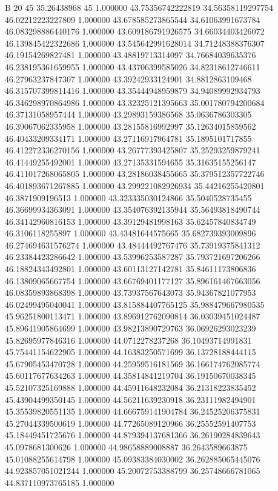 


B		20
45	35.26438968	45	1.000000
43.75356742222819	34.56358119297754	46.02212223227809	1.000000
43.678585273865544	34.61063991673784	46.083298886440176	1.000000
43.609186791926575	34.66034403426072	46.139845422322686	1.000000
43.545642991628014	34.71248388376307	46.19154269827481	1.000000
43.48819713314097	34.76684039635376	46.238195361659955	1.000000
43.43706399585026	34.82318612746611	46.27963237847307	1.000000
43.39242933124901	34.8812863109468	46.315707399811416	1.000000
43.35444948959879	34.94089992934793	46.346298970864986	1.000000
43.32325121395663	35.001780794200684	46.37131058957444	1.000000
43.29893159386568	35.0636786303305	46.39067062335958	1.000000
43.28155816992997	35.12634015859562	46.40433209334171	1.000000
43.27116917964781	35.1895101717855	46.412272336270156	1.000000
43.26777393425807	35.25293259879241	46.41449255492001	1.000000
43.27135331594655	35.31635155256147	46.411017268065805	1.000000
43.28186038455665	35.379512357722746	46.401893671267885	1.000000
43.299221082926934	35.44216255420801	46.3871909196513	1.000000
43.323335030124866	35.5040528735455	46.36699934363091	1.000000
43.354076392135944	35.56493818490744	46.34142960816153	1.000000
43.39129481998163	35.62457840834749	46.3106118255897	1.000000
43.43481644575665	35.682739393009896	46.274694631576274	1.000000
43.48444492767476	35.73919375841312	46.23384423286642	1.000000
43.53996253587287	35.793721697206266	46.18824343492801	1.000000
43.60113127142781	35.84611173806836	46.13809065667754	1.000000
43.66769401177127	35.896161467663056	46.08359893868398	1.000000
43.73937567643073	35.94367821077953	46.02499495040041	1.000000
43.815884407765125	35.988479667980535	45.96251800113471	1.000000
43.896912762090814	36.03039451024487	45.89641905864699	1.000000
43.98213890729763	36.06926293023239	45.82695977846316	1.000000
44.0712278237268	36.10493714991831	45.75441154622905	1.000000
44.16383250571699	36.13728188444115	45.67905453470728	1.000000
44.25959516181569	36.166174762085774	45.60117677634263	1.000000
44.35814841219704	36.19150670038345	45.52107325169888	1.000000
44.45911648232084	36.21318223835452	45.43904499350145	1.000000
44.56211639230918	36.23111982494901	45.35539820551135	1.000000
44.666759141904784	36.24525206375831	45.27044339500619	1.000000
44.77265089120966	36.25552591407753	45.18449451725676	1.000000
44.879394137681366	36.26190284839643	45.0978681300626	1.000000
44.98658889008887	36.2643589663875	45.01088255614798	1.000000
45.09383384030002	36.262885065445076	44.923857051021244	1.000000
45.20072753388799	36.25748666781065	44.837110973765185	1.000000
